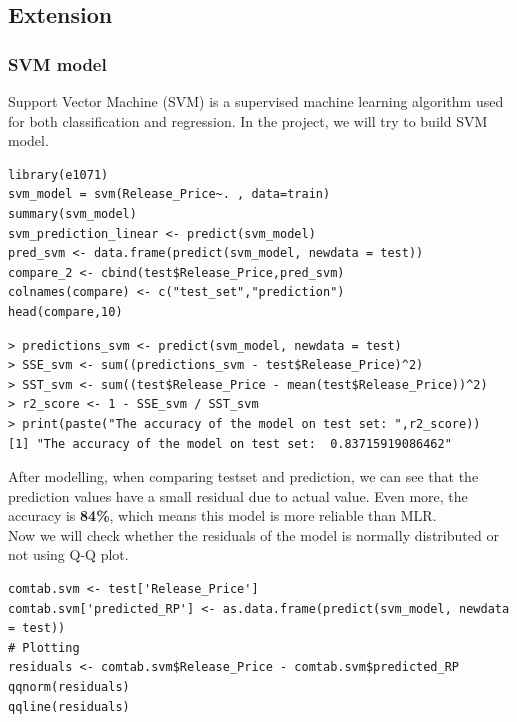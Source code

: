 \documentclass[a4paper]{article}
\theoremstyle{definition}
\begin{document}
\subsection{Extension}
\subsubsection{SVM model}
Support Vector Machine (SVM) is a supervised machine learning algorithm used for both classification and regression. In the project, we will try to build SVM model.
\begin{mdframed}[leftline=false,rightline=false,backgroundcolor=lightblue!10,nobreak=false,numbers=false]
    \begin{verbatim}
library(e1071)
svm_model = svm(Release_Price~. , data=train)
summary(svm_model)
svm_prediction_linear <- predict(svm_model)
pred_svm <- data.frame(predict(svm_model, newdata = test))
compare_2 <- cbind(test$Release_Price,pred_svm)
colnames(compare) <- c("test_set","prediction")
head(compare,10)
\end{verbatim}
\end{mdframed}

\begin{mdframed}[leftline=false,rightline=false,backgroundcolor=lightblue!10,nobreak=false,numbers=false]
    \begin{verbatim}
> predictions_svm <- predict(svm_model, newdata = test)
> SSE_svm <- sum((predictions_svm - test$Release_Price)^2)
> SST_svm <- sum((test$Release_Price - mean(test$Release_Price))^2)
> r2_score <- 1 - SSE_svm / SST_svm
> print(paste("The accuracy of the model on test set: ",r2_score))
[1] "The accuracy of the model on test set:  0.83715919086462"
\end{verbatim}
\end{mdframed}
After modelling, when comparing test\textunderscore set and prediction, we can see that the prediction values have a small residual due to actual value. Even more, the accuracy is \textbf{84\%}, which means this model is more reliable than MLR.\\
Now we will check whether the residuals of the model is normally distributed or not using Q-Q plot.
\begin{mdframed}[leftline=false,rightline=false,backgroundcolor=lightblue!10,nobreak=false,numbers=false]
    \begin{verbatim}
comtab.svm <- test['Release_Price']
comtab.svm['predicted_RP'] <- as.data.frame(predict(svm_model, newdata = test))
# Plotting
residuals <- comtab.svm$Release_Price - comtab.svm$predicted_RP
qqnorm(residuals)
qqline(residuals)
\end{verbatim}
\end{mdframed}
\end{document}
